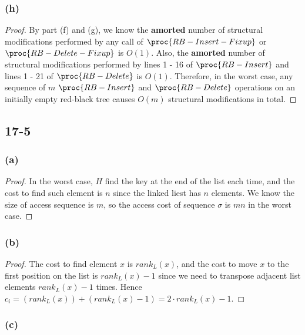 \subsubsection*{(h)}

\begin{proof}
    By part (f) and (g), we know the \textbf{amorted} number of structural modifications performed by
    any call of $\proc{RB-Insert-Fixup}$ or $\proc{RB-Delete-Fixup}$ is $O(1)$.
    Also, the \textbf{amorted} number of structural modifications performed by 
    lines 1 - 16 of $\proc{RB-Insert}$ and lines 1 - 21 of $\proc{RB-Delete}$ is $O(1)$.
    Therefore, in the worst case, 
    any sequence of $m$ $\proc{RB-Insert}$ and $\proc{RB-Delete}$ operations
    on an initially empty red-black tree causes $O(m)$ structural modifications in total.
\end{proof}

\subsection*{17-5}

\subsubsection*{(a)}

\begin{proof}
    In the worst case, $H$ find the key at the end of the list each time,
    and the cost to find such element is $n$ since the linked liest has $n$ elements.
    We know the size of access sequence is $m$, 
    so the access cost of sequence $\sigma$ is $mn$ in the worst case.
\end{proof}

\subsubsection*{(b)}

\begin{proof}
    The cost to find element $x$ is $rank_L(x)$,
    and the cost to move $x$ to the first position on the list is $rank_L(x) - 1$
    since we need to transpose adjacent list elements $rank_L(x) - 1$ times.
    Hence $c_i = (rank_L(x)) + (rank_L(x) - 1) = 2 \cdot rank_L(x) - 1$.
\end{proof}

\subsubsection*{(c)}

